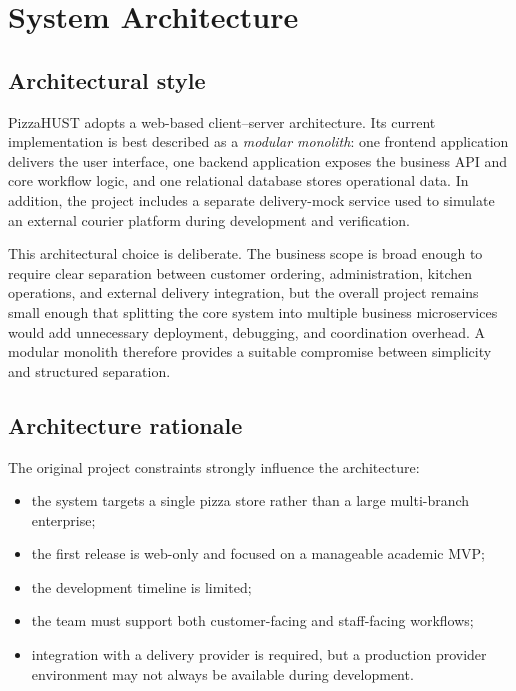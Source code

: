 \section{System Architecture}

\subsection{Architectural style}

PizzaHUST adopts a web-based client--server architecture. Its current implementation is best described as a \emph{modular monolith}: one frontend application delivers the user interface, one backend application exposes the business API and core workflow logic, and one relational database stores operational data. In addition, the project includes a separate delivery-mock service used to simulate an external courier platform during development and verification.

This architectural choice is deliberate. The business scope is broad enough to require clear separation between customer ordering, administration, kitchen operations, and external delivery integration, but the overall project remains small enough that splitting the core system into multiple business microservices would add unnecessary deployment, debugging, and coordination overhead. A modular monolith therefore provides a suitable compromise between simplicity and structured separation.

\subsection{Architecture rationale}

The original project constraints strongly influence the architecture:

\begin{itemize}
    \item the system targets a single pizza store rather than a large multi-branch enterprise;
    \item the first release is web-only and focused on a manageable academic MVP;
    \item the development timeline is limited;
    \item the team must support both customer-facing and staff-facing workflows;
    \item integration with a delivery provider is required, but a production provider environment may not always be available during development.
\end{itemize}

